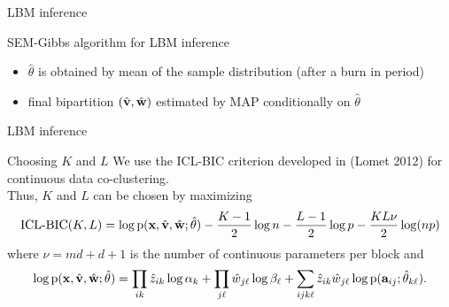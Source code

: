 \documentclass[10pt]{beamer}
\newcommand{\pdf}{\mbox{p}}
\newcommand{\ba}{\bold{a}}
\newcommand{\bx}{\bold{x}}
\newcommand{\bw}{\bold{w}}
\newcommand{\bv}{\bold{v}}
\begin{document}
\begin{frame}{LBM inference}
\begin{block}{SEM-Gibbs algorithm for LBM inference}
\begin{itemize}
\item $\hat{\theta}$ is obtained by mean of the sample distribution (after a burn in period)
\item final bipartition $(\hat{\bv},\hat{\bw})$ estimated by MAP conditionally on $\hat{\theta}$
\end{itemize}
\end{block}
\end{frame}
%
%
\begin{frame}{LBM inference}
\begin{block}{Choosing $K$ and $L$}
We use the ICL-BIC criterion developed in (Lomet 2012) for continuous data co-clustering.\\
Thus, $K$ and $L$ can be chosen by maximizing
\begin{eqnarray*}
\mbox{ICL-BIC}(K,L)= \log \pdf(\bx,\hat{\bv},\hat{\bw};\hat{\theta}) -\frac{K-1}{2}\log n  -\frac{L-1}{2}\log p-\frac{KL\nu}{2}\log (np)  
\end{eqnarray*}
where $\nu=md+d+1$ is the number of continuous parameters per block and 
\begin{eqnarray*}
\log \pdf(\bx,\hat{\bv},\hat{\bw};\hat{\theta}) =\prod_{ik} \hat z_{ik}\log \alpha_{k} + \prod_{j\ell} \hat w_{j\ell}\log \beta_{\ell}+  \sum_{ijk\ell}\hat z_{ik} \hat w_{j\ell}\log \pdf(\ba_{ij};\hat\theta_{k\ell}).
\end{eqnarray*}
\end{block}
\end{frame}
%
\end{document}
